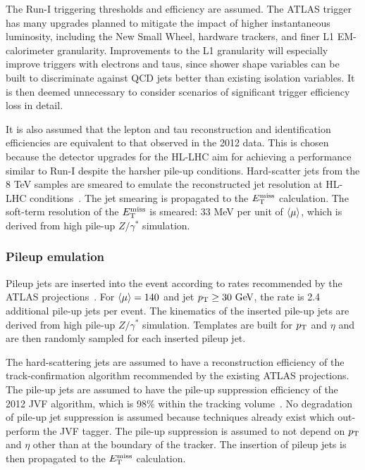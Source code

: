 The Run-I triggering thresholds and efficiency are assumed. The ATLAS trigger has many upgrades planned to mitigate the impact of higher instantaneous luminosity, including the New Small Wheel, hardware trackers, and finer L1 EM-calorimeter granularity. Improvements to the L1 granularity will especially improve triggers with electrons and taus, since shower shape variables can be built to discriminate against QCD jets better than existing isolation variables. It is then deemed unnecessary to consider scenarios of significant trigger efficiency loss in detail.

It is also assumed that the lepton and tau reconstruction and identification efficiencies are equivalent to that observed in the 2012 data. This is chosen because the detector upgrades for the HL-LHC aim for achieving a performance similar to Run-I despite the harsher pile-up conditions. Hard-scatter jets from the 8 TeV samples are smeared to emulate the reconstructed jet resolution at HL-LHC conditions~\cite{ATL-PHYS-PUB-2013-004}. The jet smearing is propagated to the $E_{\mathrm{T}}^{\mathrm{miss}}$ calculation. The soft-term resolution of the $E_{\mathrm{T}}^{\mathrm{miss}}$ is smeared: 33 MeV per unit of $\langle\mu\rangle$, which is derived from high pile-up $Z/\gamma^\ast$ simulation.

\subsubsection{Pileup emulation}

Pileup jets are inserted into the event according to rates recommended by the ATLAS projections~\cite{ATL-PHYS-PUB-2013-004}. For $\langle\mu\rangle=140$ and jet $\pt \ge 30 \GeV$, the rate is 2.4 additional pile-up jets per event. The kinematics of the inserted pile-up jets are derived from high pile-up $Z/\gamma^\ast$ simulation. Templates are built for $p_{\mathrm{T}}$ and $\eta$ and are then randomly sampled for each inserted pileup jet. 

The hard-scattering jets are assumed to have a reconstruction efficiency of the track-confirmation algorithm recommended by the existing ATLAS projections. The pile-up jets are assumed to have the pile-up suppression efficiency of the 2012 JVF algorithm, which is 98\% within the tracking volume~\cite{ATLAS-CONF-2014-018}. No degradation of pile-up jet suppression is assumed because techniques already exist which out-perform the JVF tagger. The pile-up suppression is assumed to not depend on $p_{\mathrm{T}}$ and $\eta$ other than at the boundary of the tracker. The insertion of pileup jets is then propagated to the $E_{\mathrm{T}}^{\mathrm{miss}}$ calculation.

